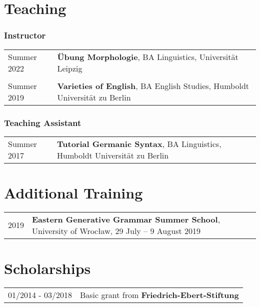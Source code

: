 \documentclass[11pt]{article}
\begin{document}
\section*{Teaching}
\subsubsection*{Instructor}
\begin{flushleft}
	\begin{tabularx}{\textwidth}{@{}p{}>{\RaggedRight\arraybackslash}p{}@{}}
		Summer 2022 & \textbf{Übung Morphologie}, BA Linguistics, Universität Leipzig \\
		& \\
		Summer 2019 & \textbf{Varieties of English}, BA English Studies, Humboldt Universität zu Berlin \\
	\end{tabularx}
\end{flushleft}
\subsubsection*{Teaching Assistant}	
\begin{flushleft}
	\begin{tabularx}{\textwidth}{@{}p{}>{\RaggedRight\arraybackslash}p{}@{}}
		Summer 2017 & \textbf{Tutorial Germanic Syntax}, BA Linguistics, Humboldt Universität zu Berlin \\
	\end{tabularx}
\end{flushleft}


\section*{Additional Training}
\begin{flushleft}
	\begin{tabularx}{\textwidth}{@{}p{}>{\RaggedRight\arraybackslash}p{}@{}}
	2019	& \textbf{Eastern Generative Grammar Summer School}, University of Wrocław, 29 July -- 9 August 2019 \\
	\end{tabularx}
\end{flushleft}

\section*{Scholarships}
\begin{flushleft}
	\begin{tabularx}{\textwidth}{@{}p{}>{\RaggedRight\arraybackslash}p{}@{}}
		01/2014 - 03/2018 & Basic grant from \textbf{Friedrich-Ebert-Stiftung} \\
	\end{tabularx}
\end{flushleft}
\end{document}
